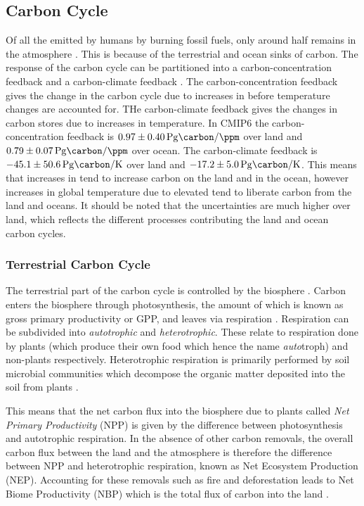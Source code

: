 \subsection{Carbon Cycle}
Of all the  emitted by humans by burning fossil fuels, only around half remains in the atmosphere \parencite{}. This is because of the terrestrial and ocean sinks of carbon.
The response of the carbon cycle can be partitioned into a carbon-concentration feedback and a carbon-climate feedback \parencite{Friedlingstein2006}. The carbon-concentration feedback
gives the change in the carbon cycle due to increases in  before temperature changes are accounted for. THe carbon-climate feedback gives the changes in carbon stores due to increases
in temperature. In CMIP6 \parencite{Arora2020} the carbon-concentration feedback is $\SI{0.97\pm0.40}{\peta\gram\carbon\per\ppm}$ over land and $\SI{0.79\pm 0.07}{\peta\gram\carbon\per\ppm}$ over ocean.
The carbon-climate feedback is $\SI{-45.1\pm50.6}{\peta\gram\carbon\per\kelvin}$ over land and $\SI{-17.2\pm5.0}{\peta\gram\carbon\per\kelvin}$. This means that increases in  tend to
increase carbon on the land and in the ocean, however increases in global temperature due to elevated  tend to liberate carbon from the land and oceans. It should be noted
that the uncertainties are much higher over land, which reflects the different processes contributing the land and ocean carbon cycles.

\subsubsection{Terrestrial Carbon Cycle}
The terrestrial part of the carbon cycle is controlled by the biosphere \parencite{AR6}. Carbon enters the biosphere through photosynthesis, the amount of which is known as gross
primary productivity or GPP, and leaves via respiration \parencite{Jenkinson1991}. Respiration can be subdivided into \emph{autotrophic} and \emph{heterotrophic}.
These relate to respiration done by plants (which produce their own food which hence the name \emph{auto}troph) and non-plants respectively. Heterotrophic respiration
is primarily performed by soil microbial communities which decompose the organic matter deposited into the soil from plants \parencite{Singh1977}.

This means that the net carbon flux into the biosphere due to plants called \emph{Net Primary Productivity} (NPP) is given by the difference between photosynthesis and
autotrophic respiration. In the absence of other carbon removals, the overall carbon flux between the land and the atmosphere is therefore the
difference between NPP and heterotrophic respiration, known as Net Ecosystem Production (NEP). Accounting for these removals such as fire and deforestation leads to
Net Biome Productivity (NBP) which is the total flux of carbon into the land \parencite{Lovett2006,Fernandez-Martinez2023}. 

